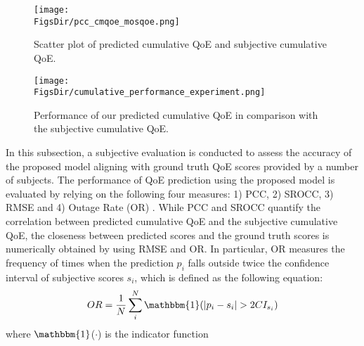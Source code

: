 \graphicspath{{Chapter3/Section3.3/Figs/}}




\begin{figure}[tb]
  \centering
  \texttt{[image: \\FigsDir/pcc\_cmqoe\_mosqoe.png]}
  \caption{Scatter plot of predicted cumulative QoE and subjective cumulative QoE.}
  \label{fig:PCC_CumulativeQoE_MOSQoE}
\end{figure}

\begin{figure}[tb]
  \centering
  \texttt{[image: \\FigsDir/cumulative\_performance\_experiment.png]}
  \caption{Performance of our predicted cumulative QoE in comparison with the subjective cumulative QoE.}
  \label{fig:CumulativePerformanceExperiment}
\end{figure}

In this subsection, a subjective evaluation is conducted to assess the accuracy of the proposed model aligning with ground truth QoE scores provided by a number of subjects. The performance of QoE prediction using the proposed model is evaluated by relying on the following four measures: 1) PCC, 2) SROCC, 3) RMSE and 4) Outage Rate (OR) \cite{QoEModel_TimeVaryingSubjectiveQuality}. While PCC and SROCC quantify the correlation between predicted cumulative QoE and the subjective cumulative QoE, the closeness between predicted scores and the ground truth scores is numerically obtained by using RMSE and OR. In particular, OR measures the frequency of times when the prediction $p_{i}$ falls outside twice the confidence interval of subjective scores $s_{i}$, which is defined as the following equation:
\begin{equation}
    OR = \frac{1}{N}\sum^{N}_{i}{\mathbbm{1}(\left | p_{i} - s_{i} \right | > 2CI_{s_{i}} )}
\end{equation}
where $\mathbbm{1}$($\cdot$) is the indicator function

